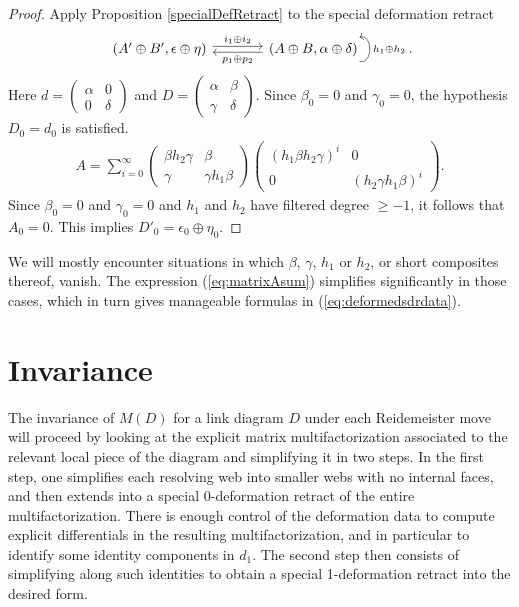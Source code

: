 \documentclass{article}
\newcommand{\sdr}[5]{%
  \begin{tikzcd}[column sep=large, ampersand replacement=\&]
    {#1} \arrow[r, "#3", shift left=0.5ex,] \arrow[r, leftarrow, "#4", shift right=0.5ex, swap] \& 
    {#2} \arrow[loop right, distance=1em, in=15, out=-15, "#5",swap]
  \end{tikzcd}%
}
\theoremstyle{plain} %
\theoremstyle{definition} %
\theoremstyle{remark} %
\begin{document}
\begin{proof}
	Apply Proposition \ref{specialDefRetract} to the special deformation retract 
	$$\sdr{(A'\oplus B',\epsilon\oplus \eta)}{(A\oplus B,\alpha\oplus \delta)}{i_1\oplus i_2}{p_1\oplus p_2}{h_1\oplus h_2}.$$
	Here $d=\begin{pmatrix}\alpha & 0\\ 0 & \delta \end{pmatrix}$ and $D=\begin{pmatrix}\alpha & \beta \\ \gamma & \delta \end{pmatrix}$. Since $\beta_0=0$ and $\gamma_0=0$, the hypothesis $D_0=d_0$ is satisfied. 
	\begin{align}\label{eq:matrixAsum}
		A= \sum_{i=0}^\infty\begin{pmatrix}
			\beta h_2\gamma& \beta \\ \gamma & \gamma h_1 \beta
		\end{pmatrix}\begin{pmatrix}
			(h_1\beta h_2\gamma)^i & 0\\ 0& (h_2\gamma h_1\beta )^i
		\end{pmatrix}.
	\end{align}
	Since $\beta_0=0$ and $\gamma_0=0$ and $h_1$ and $h_2$ have filtered degree $\geq-1$, it follows that $A_0=0$. This implies $D'_0=\epsilon_0\oplus \eta_0$.
\end{proof}
	
We will mostly encounter situations in which $\beta$, $\gamma$, $h_1$ or $h_2$, or short composites thereof, vanish. The expression (\ref{eq:matrixAsum}) simplifies significantly in those cases, which in turn gives manageable formulas in (\ref{eq:deformedsdrdata}).



 

\section{Invariance}

The invariance of $M(D)$ for a link diagram $D$ under each Reidemeister move will proceed by looking at the explicit matrix multifactorization associated to the relevant local piece of the diagram and simplifying it in two steps. In the first step, one simplifies each resolving web into smaller webs with no internal faces, and then extends into a special 0-deformation retract of the entire multifactorization. There is enough control of the deformation data to compute explicit differentials in the resulting multifactorization, and in particular to identify some identity components in $d_1$. The second step then consists of simplifying along such identities to obtain a special 1-deformation retract into the desired form.
\end{document}
